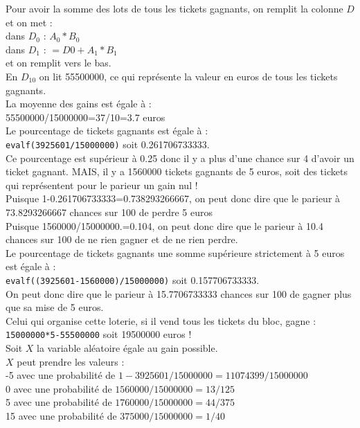 \documentclass[a4paper,11pt]{book}
\begin{document}
Pour avoir la somme des lots de tous les tickets gagnants, on remplit la 
colonne $D$ et on met :\\
dans $D_0$ : $A_0*B_0$\\
dans $D_1$ : $=D0+A_1*B_1$\\
et on remplit vers le bas.\\
En $D_{10}$ on lit 55500000, ce qui repr\'esente la valeur en euros de tous les 
tickets gagnants.\\
La moyenne des gains est \'egale \`a : \\
55500000/15000000=37/10=3.7 euros\\

Le pourcentage de tickets gagnants est \'egale \`a :\\
{\tt evalf(3925601/15000000)} soit 0.261706733333.\\
Ce pourcentage est sup\'erieur \`a 0.25 donc il y a plus d'une chance sur 4 
d'avoir un ticket gagnant. MAIS, il y a 1560000 tickets gagnants de 5 euros, 
soit des tickets qui repr\'esentent pour le parieur un gain nul ! \\
Puisque 1-0.261706733333=0.738293266667, on peut donc dire que le parieur \`a
 73.8293266667 chances sur 100 de perdre 5 euros\\
Puisque 1560000/15000000.=0.104, on peut donc dire que le parieur \`a
10.4 chances sur 100 de ne rien gagner et de ne rien perdre.\\
Le pourcentage de tickets gagnants une somme sup\'erieure strictement \`a 
5 euros est \'egale \`a :\\
{\tt evalf((3925601-1560000)/15000000)} soit 0.157706733333.\\ 
On peut donc dire que le parieur \`a 15.7706733333 chances sur 100 de gagner 
plus que sa mise de 5 euros.\\
Celui qui organise cette loterie, si il vend tous les tickets du bloc, gagne :\\
{\tt 15000000*5-55500000} soit 19500000 euros !\\
Soit $X$ la variable al\'eatoire \'egale au gain possible.\\
 $X$ peut prendre les valeurs :\\
-5 avec une probabilit\'e de $1-3925601/15000000=11074399/15000000$\\
0 avec une probabilit\'e de $1560000/15000000=13/125$\\
5  avec une probabilit\'e de $1760000/15000000=44/375$\\
15  avec une probabilit\'e de $375000/15000000=1/40$\\
\end{document}
